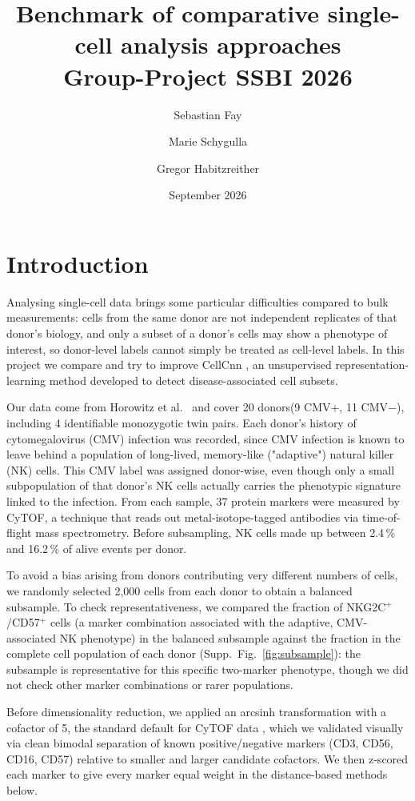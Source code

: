 \documentclass[11pt,a4paper]{article}
\title{Benchmark of comparative single-cell analysis approaches\\
\large Group-Project SSBI 2026}
\author{Sebastian Fay \and Marie Schygulla \and Gregor Habitzreither}
\date{September 2026}
\newcommand{\dr}{dimensionality reduction}
\begin{document}
\maketitle

\section*{Introduction}
Analysing single-cell data brings some particular difficulties compared to bulk measurements: cells
from the same donor are not independent replicates of that donor's biology, and only a subset of a
donor's cells may show a phenotype of interest, so donor-level labels cannot simply be treated as
cell-level labels. In this project we compare and try to improve CellCnn \citep{arvaniti2017cellcnn}, an unsupervised representation-learning method developed to detect disease-associated cell subsets.

Our data come from Horowitz et al.\ \citep{horowitz2013nk} and cover 20 donors(9 CMV+, 11 CMV$-$), including 4 identifiable monozygotic twin pairs. Each donor's history of cytomegalovirus (CMV) infection was recorded, since CMV infection is known to leave behind a population of long-lived, memory-like ("adaptive") natural killer (NK) cells. This CMV label was assigned donor-wise, even though only a small subpopulation of that donor's NK cells actually carries the phenotypic signature linked to the infection. From each sample, 37 protein markers were measured by CyTOF, a technique that reads out metal-isotope-tagged antibodies via time-of-flight
mass spectrometry. Before subsampling, NK cells made up between 2.4\,\% and 16.2\,\% of alive events per donor.

To avoid a bias arising from donors contributing very different numbers of cells, we randomly selected
2{,}000 cells from each donor to obtain a balanced subsample. To check representativeness, we compared
the fraction of NKG2C$^+$/CD57$^+$ cells (a marker combination associated with the adaptive,
CMV-associated NK phenotype) in the balanced subsample against the fraction in the complete cell
population of each donor (Supp.\ Fig.~\ref{fig:subsample}): the subsample is representative for this
specific two-marker phenotype, though we did not check other marker combinations or rarer populations.

Before \dr{}, we applied an arcsinh transformation with a cofactor of 5, the standard default for CyTOF
data \citep{bendall2011masscytometry,nowicka2017cytofworkflow}, which we validated visually via clean
bimodal separation of known positive/negative markers (CD3, CD56, CD16, CD57) relative to smaller and
larger candidate cofactors. We then z-scored each marker to give every marker equal weight in the distance-based methods below.
\end{document}
